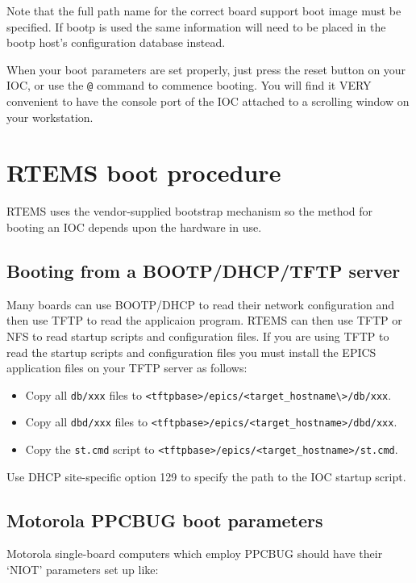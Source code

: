 Note that the full path name for the correct board support boot image must be specified. If bootp is used the same 
information will need to be placed in the bootp host's configuration database instead.

When your boot parameters are set properly, just press the reset button on your IOC, or use the \verb|@| command to commence 
booting. You will find it VERY convenient to have the console port of the IOC attached to a scrolling window on your 
workstation.

\section{RTEMS boot procedure}

RTEMS uses the vendor-supplied bootstrap mechanism so the method for booting an IOC depends upon the hardware in 
use.

\subsection{Booting from a BOOTP/DHCP/TFTP server}

Many boards can use BOOTP/DHCP to read their network configuration and then use TFTP to read the applicaion 
program.  RTEMS can then use TFTP or NFS to read startup scripts and configuration files. If you are using TFTP to read 
the startup scripts and configuration files you must install the EPICS application files on your TFTP server as follows:

\begin{itemize}
\item Copy all \verb|db/xxx| files to \verb|<tftpbase>/epics/<target_hostname\>/db/xxx|.

\item Copy all \verb|dbd/xxx| files to \verb|<tftpbase>/epics/<target_hostname>/dbd/xxx|.

\item Copy the \verb|st.cmd| script  to \verb|<tftpbase>/epics/<target_hostname>/st.cmd|.
\end{itemize}

Use DHCP site-specific option 129 to specify the path to the IOC startup script.

\subsection{Motorola PPCBUG boot parameters}

Motorola single-board computers which employ PPCBUG should have their `NIOT' parameters set up like:

